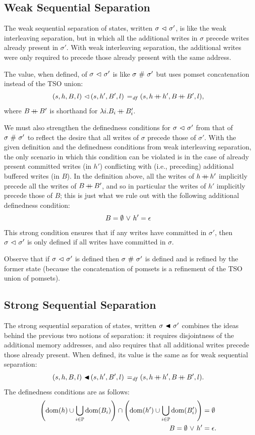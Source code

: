 \documentclass[11pt]{report}
\begin{document}
\subsection{Weak Sequential Separation}

The weak sequential separation of states, written $\sigma \operatorname{\,\vartriangleleft\,} \sigma'$, is like the weak interleaving separation, but in which all the additional writes in $\sigma$ precede writes already present in $\sigma'$. With weak interleaving separation, the additional writes were only required to precede those already present with the same address. 

The value, when defined, of $\sigma \operatorname{\,\vartriangleleft\,} \sigma'$ is like $\sigma \operatorname{\,\#\,} \sigma'$ but uses pomset concatenation instead of the TSO union: \[ (s,h,B,l) \operatorname{\,\vartriangleleft\,} (s,h',B',l) \operatorname{\;=_{\mathit{df}}\;} (s,h \operatorname{+\!\!\!+} h',B \operatorname{+\!\!\!+} B',l),\] where $B \operatorname{+\!\!\!+} B'$ is shorthand for $\lambda i . B_i \operatorname{+\!\!\!+} B'_i$. 

We must also strengthen the definedness conditions for $\sigma \operatorname{\,\vartriangleleft\,} \sigma'$ from that of $\sigma \operatorname{\,\#\,} \sigma'$ to reflect the desire that all writes of $\sigma$ precede those of $\sigma'$. With the given definition and the definedness conditions from weak interleaving separation, the only scenario in which this condition can be violated is in the case of already present committed writes (in $h'$) conflicting with (i.e., preceding) additional buffered writes (in $B$). In the definition above, all the writes of $h \operatorname{+\!\!\!+} h'$ implicitly precede all the writes of $B \operatorname{+\!\!\!+} B'$, and so in particular the writes of $h'$ implicitly precede those of $B$; this is just what we rule out with the following additional definedness condition: \[ B = \operatorname{\emptyset} \operatorname{\,\vee\,} h' = \epsilon \] This strong condition ensures that if any writes have committed in $\sigma'$, then $\sigma \operatorname{\,\vartriangleleft\,} \sigma'$ is only defined if all writes have committed in $\sigma$. 

Observe that if $\sigma \operatorname{\,\vartriangleleft\,} \sigma'$ is defined then $\sigma \operatorname{\,\#\,} \sigma'$ is defined and is refined by the former state (because the concatenation of pomsets is a refinement of the TSO union of pomsets). 

\subsection{Strong Sequential Separation}

The strong sequential separation of states, written $\sigma \operatorname{\,\blacktriangleleft\,} \sigma'$ combines the ideas behind the previous two notions of separation: it requires disjointness of the additional memory addresses, and also requires that all additional writes precede those already present. When defined, its value is the same as for weak sequential separation: \[ (s,h,B,l) \operatorname{\,\blacktriangleleft\,} (s,h',B',l) \operatorname{\;=_{\mathit{df}}\;} (s,h \operatorname{+\!\!\!+} h', B \operatorname{+\!\!\!+} B',l).\] The definedness conditions are as follows: \begin{align*}
  \left(\operatorname{\mathrm{dom}}(h) \cup \bigcup_{i \in \mathbb{P}} \operatorname{\mathrm{dom}}(B_i) \right) \cap \left( \operatorname{\mathrm{dom}}(h') \cup \bigcup_{i \in \mathbb{P}} \operatorname{\mathrm{dom}}(B'_i)\right) & = \operatorname{\emptyset} \\ 
  B = \operatorname{\emptyset} \operatorname{\,\vee\,} h' & = \epsilon.
\end{align*}
\end{document}
